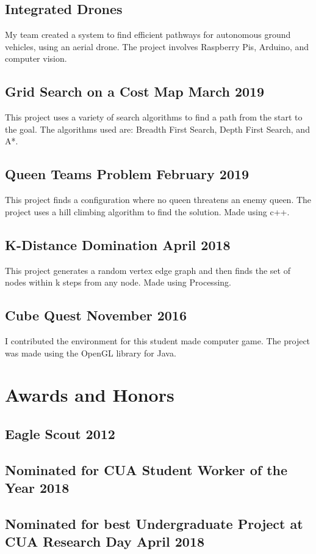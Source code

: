 \documentclass{article}
\begin{document}
\subsection {Integrated Drones}
My team created a system to find efficient pathways for autonomous ground vehicles, using an aerial drone.
The project involves Raspberry Pis, Arduino, and computer vision.

\subsection{Grid Search on a Cost Map \hfill March 2019}
This project uses a variety of search algorithms to find a path from the start to the goal.
The algorithms used are:
Breadth First Search,
Depth First Search,
and
A*.
\subsection{Queen Teams Problem \hfill February 2019}
This project finds a configuration where no queen threatens an enemy queen.
The project uses a hill climbing algorithm to find the solution.
Made using c++.

\subsection{K-Distance Domination \hfill April 2018}
This project generates a random vertex edge graph and then finds the set of nodes within k steps from any node.
Made using Processing.

\subsection{Cube Quest \hfill November 2016}
I contributed the environment for this student made computer game.
The project was made using the OpenGL library for Java.


\section{Awards and Honors}
\subsection{Eagle Scout \hfill 2012}
\subsection{Nominated for CUA Student Worker of the Year \hfill 2018}
\subsection{Nominated for best Undergraduate Project at CUA Research Day \hfill April 2018}
\end{document}
